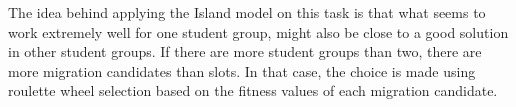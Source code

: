 The idea behind applying the Island model on this task is that what seems to work
extremely well for one student group, might also be close to a good solution in
other student groups. If there are more student groups than two, there are more
migration candidates than slots. In that case, the choice is made using
roulette wheel selection based on the fitness values of each migration
candidate.
